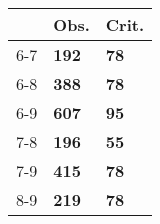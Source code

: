 \begin{table}[ht]
\centering
\begin{tabular}{rll}
  \hline
 & Obs. & Crit. \\ 
  \hline
6-7 & \textbf{192} & \textbf{78} \\ 
  6-8 & \textbf{388} & \textbf{78} \\ 
  6-9 & \textbf{607} & \textbf{95} \\ 
  7-8 & \textbf{196} & \textbf{55} \\ 
  7-9 & \textbf{415} & \textbf{78} \\ 
  8-9 & \textbf{219} & \textbf{78} \\ 
   \hline
\end{tabular}
\end{table}
